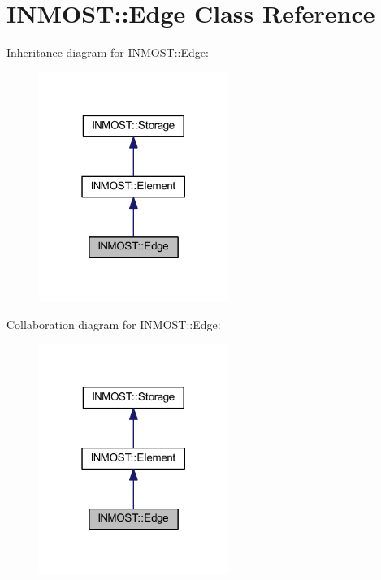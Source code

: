 \hypertarget{classINMOST_1_1Edge}{\section{I\-N\-M\-O\-S\-T\-:\-:Edge Class Reference}
\label{classINMOST_1_1Edge}
}


Inheritance diagram for I\-N\-M\-O\-S\-T\-:\-:Edge\-:
\nopagebreak
\begin{figure}[H]
\begin{center}
\leavevmode
\includegraphics[width=175pt]{classINMOST_1_1Edge__inherit__graph}
\end{center}
\end{figure}


Collaboration diagram for I\-N\-M\-O\-S\-T\-:\-:Edge\-:
\nopagebreak
\begin{figure}[H]
\begin{center}
\leavevmode
\includegraphics[width=175pt]{classINMOST_1_1Edge__coll__graph}
\end{center}
\end{figure}
